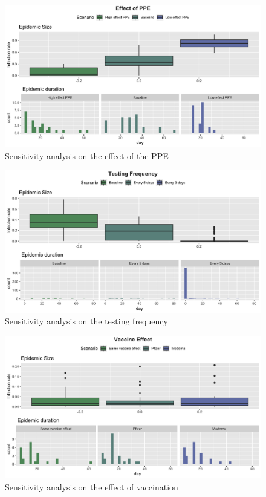 \documentclass[
]{article}
\begin{document}
\begin{figure}
\caption{Sensitivity analysis on the effect of the PPE}
\centering
\includegraphics{Figures/SensitivityAnalysis/PPE}  
\end{figure}

\begin{figure}
\caption{Sensitivity analysis on the testing frequency}
\centering
\includegraphics{Figures/SensitivityAnalysis/TestingFreq}
\end{figure}

\begin{figure}
\caption{Sensitivity analysis on the effect of vaccination}
\centering
\includegraphics{Figures/SensitivityAnalysis/VaccinationEf}  
\end{figure}
\end{document}
